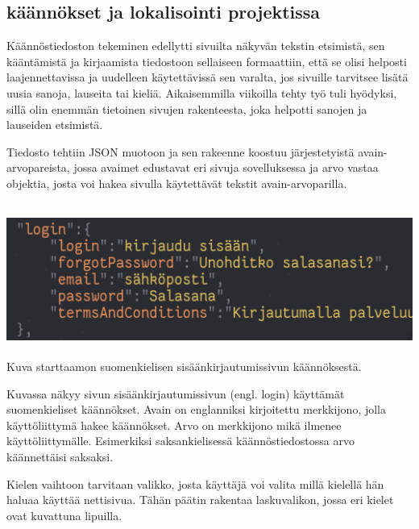 \documentclass[11pt,a4paper,titlepage,oneside]{article}
\begin{document}
\subsection*{käännökset ja lokalisointi projektissa}

Käännöstiedoston tekeminen edellytti sivuilta näkyvän tekstin etsimistä, sen kääntämistä ja kirjaamista tiedostoon sellaiseen formaattiin, että se olisi helposti laajennettavissa ja uudelleen käytettävissä sen varalta, jos sivuille tarvitsee lisätä uusia sanoja, lauseita tai kieliä.
Aikaisemmilla viikoilla tehty työ tuli hyödyksi, sillä olin enemmän tietoinen sivujen rakenteesta, joka helpotti sanojen ja lauseiden etsimistä.\medskip

Tiedosto tehtiin JSON muotoon ja sen rakeenne koostuu järjestetyistä avain-arvopareista, jossa avaimet edustavat eri sivuja sovelluksessa ja
arvo vastaa objektia, josta voi hakea sivulla käytettävät tekstit avain-arvoparilla.



\medskip
\includegraphics[width= 15cm, height=5cm]{src/public/jsonfixed.png} \\
\medskip
Kuva starttaamon suomenkielisen sisäänkirjautumissivun käännöksestä.
\medskip

Kuvassa näkyy sivun sisäänkirjautumissivun (engl. login) käyttämät suomenkieliset käännökset. Avain on englanniksi kirjoitettu merkkijono, jolla käyttöliittymä hakee käännökset. Arvo on merkkijono mikä ilmenee käyttöliittymälle.
Esimerkiksi saksankielisessä käännöstiedostossa arvo käännettäisi saksaksi.

\medskip

Kielen vaihtoon tarvitaan valikko, josta käyttäjä voi valita millä kielellä hän haluaa käyttää nettisivua. 
Tähän päätin rakentaa laskuvalikon, jossa eri kielet ovat kuvattuna lipuilla.
\medskip
\end{document}
